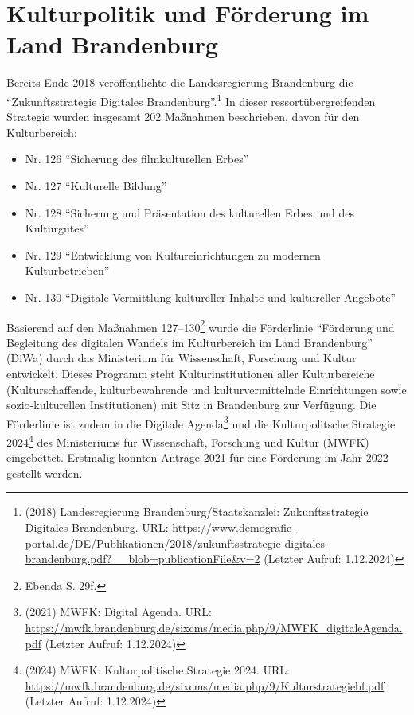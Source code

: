 \documentclass[a4paper,
fontsize=11pt,
oneside,
numbers=noperiodatend,
parskip=half-,
bibliography=totoc,
final
]{scrartcl}
\begin{document}
\section{Kulturpolitik und Förderung im Land
Brandenburg}\label{kulturpolitik-und-fuxf6rderung-im-land-brandenburg}

Bereits Ende 2018 veröffentlichte die Landesregierung Brandenburg die
\enquote{Zukunftsstrategie Digitales Brandenburg}.\footnote{(2018)
  Landesregierung Brandenburg/Staatskanzlei: Zukunftsstrategie Digitales
  Brandenburg. URL:
  \url{https://www.demografie-portal.de/DE/Publikationen/2018/zukunftsstrategie-digitales-brandenburg.pdf?__blob=publicationFile&v=2}
  (Letzter Aufruf: 1.12.2024)} In dieser ressortübergreifenden Strategie
wurden insgesamt 202 Maßnahmen beschrieben, davon für den Kulturbereich:

\begin{itemize}
\item
  Nr. 126 \enquote{Sicherung des filmkulturellen Erbes}
\item
  Nr. 127 \enquote{Kulturelle Bildung}
\item
  Nr. 128 \enquote{Sicherung und Präsentation des kulturellen Erbes und
  des Kulturgutes}
\item
  Nr. 129 \enquote{Entwicklung von Kultureinrichtungen zu modernen
  Kulturbetrieben}
\item
  Nr. 130 \enquote{Digitale Vermittlung kultureller Inhalte und
  kultureller Angebote}
\end{itemize}

Basierend auf den Maßnahmen 127--130\footnote{Ebenda S. 29f.} wurde die
Förderlinie \enquote{Förderung und Begleitung des digitalen Wandels im
Kulturbereich im Land Brandenburg} (DiWa) durch das Ministerium für
Wissenschaft, Forschung und Kultur entwickelt. Dieses Programm steht
Kulturinstitutionen aller Kulturbereiche (Kulturschaffende,
kulturbewahrende und kulturvermittelnde Einrichtungen sowie
sozio-kulturellen Institutionen) mit Sitz in Brandenburg zur Verfügung.
Die Förderlinie ist zudem in die Digitale Agenda\footnote{(2021) MWFK:
  Digital Agenda. URL:
  \url{https://mwfk.brandenburg.de/sixcms/media.php/9/MWFK_digitaleAgenda.pdf}
  (Letzter Aufruf: 1.12.2024)} und die Kulturpolitsche Strategie
2024\footnote{(2024) MWFK: Kulturpolitische Strategie 2024. URL:
  \url{https://mwfk.brandenburg.de/sixcms/media.php/9/Kulturstrategiebf.pdf}
  (Letzter Aufruf: 1.12.2024)} des Ministeriums für Wissenschaft,
Forschung und Kultur (MWFK) eingebettet. Erstmalig konnten Anträge 2021
für eine Förderung im Jahr 2022 gestellt werden.
\end{document}
